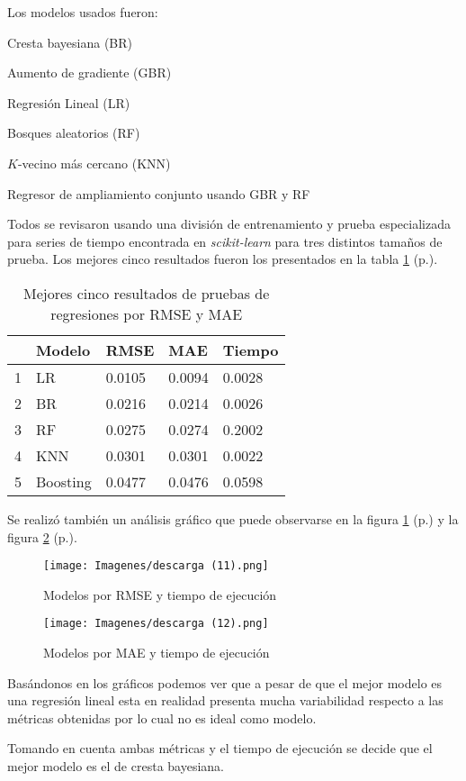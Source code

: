 \documentclass[13.6pt]{article}
\let\tempone\itemize
\let\temptwo\enditemize
\renewenvironment{itemize}{\tempone\setlength{\itemsep}{0pt}}{\temptwo}
\begin{document}
Los modelos usados fueron:

\begin{itemize}
\item Cresta bayesiana (BR)
\item Aumento de gradiente (GBR)
\item Regresión Lineal (LR)
\item Bosques aleatorios (RF)
\item $K$-vecino más cercano (KNN)
\item Regresor de ampliamiento conjunto usando GBR y RF
\end{itemize}


Todos se revisaron usando una división de entrenamiento y prueba especializada para series de tiempo encontrada en \textit{scikit-learn} para tres distintos tamaños de prueba. Los mejores cinco resultados fueron los presentados en la tabla \ref{table:mejores20} (p.\pageref{table:mejores20}).

\begin{table}[h] \centering
\caption{Mejores cinco resultados de pruebas de regresiones por RMSE y MAE}
\label{table:mejores20}
\begin{tabular}{lllll}
\hline
  & \textbf{Modelo} & \textbf{RMSE} & \textbf{MAE} & \textbf{Tiempo} \\ \hline
1 & LR  & 0.0105 & 0.0094   & 0.0028          \\
2 & BR    & 0.0216   & 0.0214        & 0.0026          \\
3 & RF     & 0.0275     & 0.0274          & 0.2002          \\
4 & KNN   & 0.0301		& 0.0301      & 0.0022           \\
5 & Boosting   & 0.0477  & 0.0476     & 0.0598       \\ \hline
\end{tabular}
\end{table}

Se realizó también un análisis gráfico que puede observarse en la figura \ref{fig: rmse} (p.\pageref{fig: rmse}) y la figura \ref{fig: r2} (p.\pageref{fig: r2}).

\begin{figure}
\texttt{[image: Imagenes/descarga (11).png]}
\caption{Modelos por RMSE y tiempo de ejecución}
\label{fig: rmse}
\end{figure}


\begin{figure}
\texttt{[image: Imagenes/descarga (12).png]}
\caption{Modelos por MAE y tiempo de ejecución}
\label{fig: r2}
\end{figure}

Basándonos en los gráficos podemos ver que a pesar de que el mejor modelo es una regresión lineal esta en realidad presenta mucha variabilidad respecto a las métricas obtenidas por lo cual no es ideal como modelo.

Tomando en cuenta ambas métricas y el tiempo de ejecución se decide que el mejor modelo es el de cresta bayesiana.

\clearpagepage
\newpage


\end{document}
